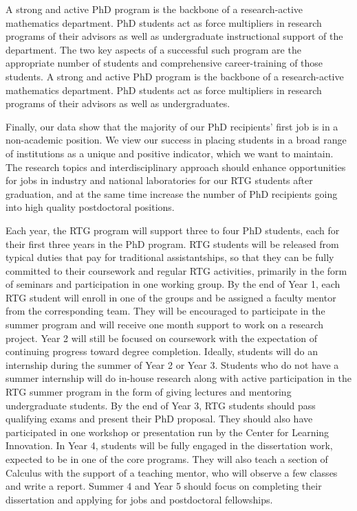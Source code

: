 \documentclass[11pt]{NSFamsart}
\begin{document}
A strong and active PhD program is the backbone of a research-active mathematics department. PhD students act as force multipliers in research programs of their advisors as well as undergraduate instructional support of the department. The two key aspects of a successful such program are the appropriate number of students and comprehensive career-training of those students.
A strong and active PhD program is the backbone of a research-active mathematics department. PhD students act as force multipliers in research programs of their advisors as well as undergraduates.


Finally, our data show that the majority of our PhD recipients’ first job is in a non-academic position.
We view our success in placing students in a broad range of institutions as a unique and positive indicator,
which we want to maintain. The research topics and interdisciplinary approach should enhance opportunities
for jobs in industry and national laboratories for our RTG students after graduation, and at the same time
increase the number of PhD recipients going into high quality postdoctoral positions.


Each year, the RTG program will support three to four PhD students, each for their first three years in the
PhD program. RTG students will be released from typical duties that pay for traditional assistantships, so
that they can be fully committed to their coursework and regular RTG activities, primarily in the form of
seminars and participation in one working group. By the end of Year 1, each RTG student will enroll in one
of the groups and be assigned a faculty mentor from the corresponding team. They will be encouraged to
participate in the summer program and will receive one month support to work on a research project. Year 2
will still be focused on coursework with the expectation of continuing progress toward degree completion.
Ideally, students will do an internship during the summer of Year 2 or Year 3. Students who do not have
a summer internship will do in-house research along with active participation in the RTG summer program
in the form of giving lectures and mentoring undergraduate students. By the end of Year 3, RTG students
should pass qualifying exams and present their PhD proposal. They should also have participated in one   workshop or presentation run by the Center for Learning Innovation. In Year 4, students will be fully engaged in the dissertation work, expected
to be in one of the core programs. They will also teach a section of Calculus with the support of a teaching
mentor, who will observe a few classes and write a report. Summer 4 and Year 5 should focus on completing
their dissertation and applying for jobs and postdoctoral fellowships.
\end{document}
